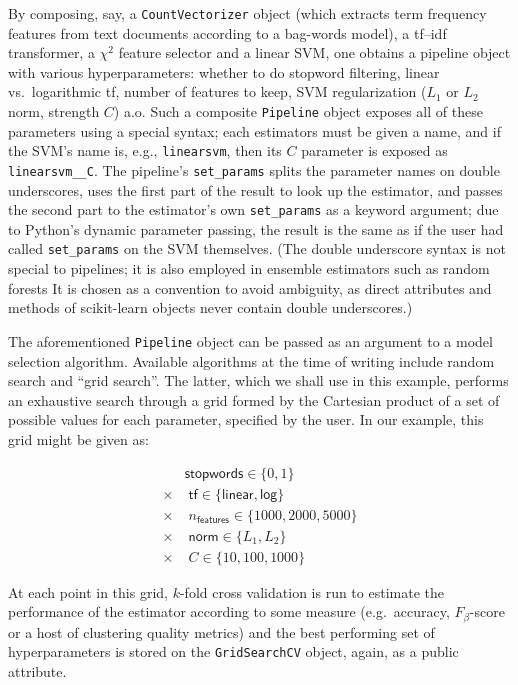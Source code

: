 \documentclass[a4paper]{article}
\begin{document}
By composing, say, a \texttt{CountVectorizer} object
(which extracts term frequency features from text documents
according to a bag-words model),
a \textsf{tf--idf} transformer, a $\chi^2$ feature selector and a linear SVM,
one obtains a pipeline object with various hyperparameters:
whether to do stopword filtering,
linear vs.\ logarithmic \textsf{tf}, number of features to keep,
SVM regularization ($L_1$ or $L_2$ norm, strength $C$) a.o.
Such a composite \texttt{Pipeline} object
exposes all of these parameters using a special syntax;
each estimators must be given a name,
and if the SVM's name is, e.g., \texttt{linearsvm},
then its $C$ parameter is exposed as \texttt{linearsvm\_\_C}.
The pipeline's \texttt{set\_params} splits the parameter names
on double underscores, uses the first part of the result
to look up the estimator,
and passes the second part to the estimator's own \texttt{set\_params}
as a keyword argument; due to Python's dynamic parameter passing,
the result is the same as if the user had called \texttt{set\_params}
on the SVM themselves.
(The double underscore syntax is not special to pipelines;
it is also employed in ensemble estimators such as random forests
It is chosen as a convention to avoid ambiguity, as direct
attributes and methods of scikit-learn objects never contain
double underscores.)

The aforementioned \texttt{Pipeline} object
can be passed as an argument to a model selection algorithm.
Available algorithms at the time of writing include random search
\citep{bergstra2012} and ``grid search''.
The latter, which we shall use in this example,
performs an exhaustive search through a grid formed by the Cartesian product
of a set of possible values for each parameter, specified by the user.
In our example, this grid might be given as:

\begin{align*}
         & \textsf{stopwords} \in \{0, 1\}                      \\
  \times & \; \textsf{tf} \in \{\textsf{linear}, \textsf{log}\} \\
  \times & \; n_\textsf{features} \in \{1000, 2000, 5000\}      \\
  \times & \; \textsf{norm} \in \{L_1, L_2\}                    \\
  \times & \; C \in \{10, 100, 1000\}
\end{align*}

At each point in this grid, $k$-fold cross validation is run
to estimate the performance of the estimator according to some measure
(e.g.\ accuracy, $F_\beta$-score or a host of clustering quality metrics)
and the best performing set of hyperparameters is stored
on the \texttt{GridSearchCV} object, again, as a public attribute.
\end{document}
